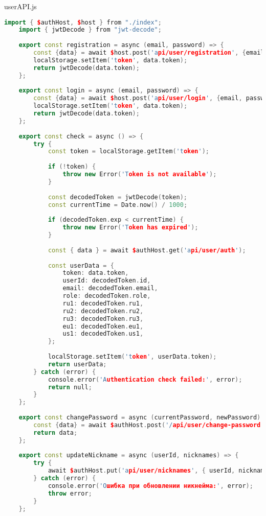 userAPI.js
\begin{lstlisting}[language=C++]
	import { $authHost, $host } from "./index";
	import { jwtDecode } from "jwt-decode";
	
	export const registration = async (email, password) => {
		const {data} = await $host.post('api/user/registration', {email, password, role: 'ADMIN'});
		localStorage.setItem('token', data.token);
		return jwtDecode(data.token);
	};
	
	export const login = async (email, password) => {
		const {data} = await $host.post('api/user/login', {email, password});
		localStorage.setItem('token', data.token);
		return jwtDecode(data.token);
	};
	
	export const check = async () => {
		try {
			const token = localStorage.getItem('token');
			
			if (!token) {
				throw new Error('Token is not available');
			}
			
			const decodedToken = jwtDecode(token);
			const currentTime = Date.now() / 1000;
			
			if (decodedToken.exp < currentTime) {
				throw new Error('Token has expired');
			}
			
			const { data } = await $authHost.get('api/user/auth');
			
			const userData = {
				token: data.token,
				userId: decodedToken.id,
				email: decodedToken.email,
				role: decodedToken.role,
				ru1: decodedToken.ru1,
				ru2: decodedToken.ru2,
				ru3: decodedToken.ru3,
				eu1: decodedToken.eu1,
				us1: decodedToken.us1,
			};
			
			localStorage.setItem('token', userData.token);
			return userData;
		} catch (error) {
			console.error('Authentication check failed:', error);
			return null;
		}
	};
	
	export const changePassword = async (currentPassword, newPassword) => {
		const {data} = await $authHost.post('/api/user/change-password', { currentPassword, newPassword });
		return data;
	};
	
	export const updateNickname = async (userId, nicknames) => {
		try {
			await $authHost.put('api/user/nicknames', { userId, nicknames });
		} catch (error) {
			console.error('Ошибка при обновлении никнейма:', error);
			throw error;
		}
	};
\end{lstlisting}

\fi
